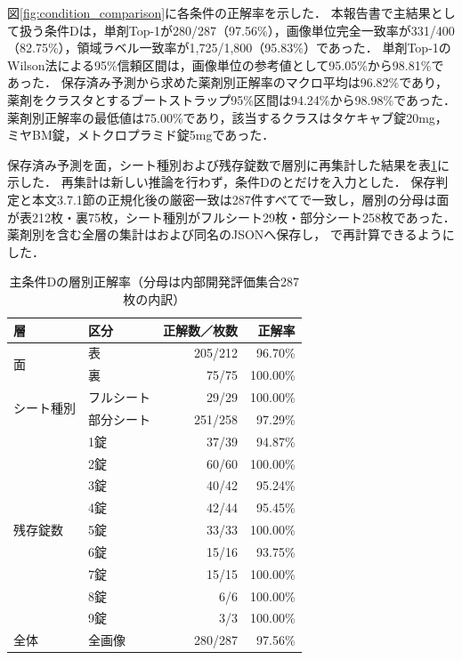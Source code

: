 \documentclass[uplatex,dvipdfmx]{jsarticle}
\begin{document}
図\ref{fig:condition_comparison}に各条件の正解率を示した．
本報告書で主結果として扱う条件Dは，単剤Top-1が280/287（97.56\%），画像単位完全一致率が331/400（82.75\%），領域ラベル一致率が1,725/1,800（95.83\%）であった．
単剤Top-1のWilson法による95\%信頼区間は，画像単位の参考値として95.05\%から98.81\%であった．
保存済み予測から求めた薬剤別正解率のマクロ平均は96.82\%であり，薬剤をクラスタとするブートストラップ95\%区間は94.24\%から98.98\%であった．
薬剤別正解率の最低値は75.00\%であり，該当するクラスはタケキャブ錠20mg，ミヤBM錠，メトクロプラミド錠5mgであった．

保存済み予測を面，シート種別および残存錠数で層別に再集計した結果を表\ref{tab:condition_d_stratified}に示した．
再集計は新しい推論を行わず，条件Dのとだけを入力とした．
保存判定と本文3.7.1節の正規化後の厳密一致は287件すべてで一致し，層別の分母は面が表212枚・裏75枚，シート種別がフルシート29枚・部分シート258枚であった．
薬剤別を含む全層の集計はおよび同名のJSONへ保存し，
で再計算できるようにした．

\begin{table}[H]
  \centering
  \caption{主条件Dの層別正解率（分母は内部開発評価集合287枚の内訳）}
  \label{tab:condition_d_stratified}
  \small
  \begin{tabular}{|l|l|r|r|}
    \hline
    層 & 区分 & 正解数／枚数 & 正解率 \\ \hline
    \multirow{2}{*}{面} & 表 & 205/212 & 96.70\% \\ \cline{2-4}
     & 裏 & 75/75 & 100.00\% \\ \hline
    \multirow{2}{*}{シート種別} & フルシート & 29/29 & 100.00\% \\ \cline{2-4}
     & 部分シート & 251/258 & 97.29\% \\ \hline
    \multirow{9}{*}{残存錠数} & 1錠 & 37/39 & 94.87\% \\ \cline{2-4}
     & 2錠 & 60/60 & 100.00\% \\ \cline{2-4}
     & 3錠 & 40/42 & 95.24\% \\ \cline{2-4}
     & 4錠 & 42/44 & 95.45\% \\ \cline{2-4}
     & 5錠 & 33/33 & 100.00\% \\ \cline{2-4}
     & 6錠 & 15/16 & 93.75\% \\ \cline{2-4}
     & 7錠 & 15/15 & 100.00\% \\ \cline{2-4}
     & 8錠 & 6/6 & 100.00\% \\ \cline{2-4}
     & 9錠 & 3/3 & 100.00\% \\ \hline
    全体 & 全画像 & 280/287 & 97.56\% \\ \hline
  \end{tabular}
\end{table}
\end{document}
